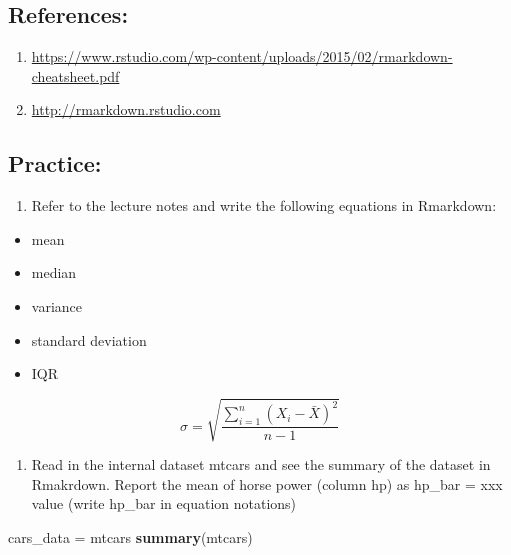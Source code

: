 \documentclass[]{article}
\newenvironment{Shaded}{\begin{snugshade}}{\end{snugshade}}
\newcommand{\KeywordTok}[1]{\textcolor[rgb]{0.13,0.29,0.53}{\textbf{#1}}}
\newcommand{\NormalTok}[1]{#1}
\newcommand{\StringTok}[1]{\textcolor[rgb]{0.31,0.60,0.02}{#1}}
\providecommand{\tightlist}{%
  \setlength{\itemsep}{0pt}\setlength{\parskip}{0pt}}
\begin{document}
\hypertarget{references}{%
\subsection{References:}\label{references}}

\begin{enumerate}
\def\labelenumi{\arabic{enumi}.}
\tightlist
\item
  \url{https://www.rstudio.com/wp-content/uploads/2015/02/rmarkdown-cheatsheet.pdf}
\item
  \url{http://rmarkdown.rstudio.com}
\end{enumerate}

\hypertarget{practice}{%
\subsection{Practice:}\label{practice}}

\begin{enumerate}
\def\labelenumi{\arabic{enumi}.}
\tightlist
\item
  Refer to the lecture notes and write the following equations in
  Rmarkdown:
\end{enumerate}

\begin{itemize}
\tightlist
\item
  mean
\item
  median
\item
  variance
\item
  standard deviation
\item
  IQR
\end{itemize}

\[{\sigma} = \sqrt{\frac{\sum_{i=1}^n (X_i - \bar{X})^2}{n-1}}\]

\begin{enumerate}
\def\labelenumi{\arabic{enumi}.}
\setcounter{enumi}{1}
\tightlist
\item
  Read in the internal dataset mtcars and see the summary of the dataset
  in Rmakrdown. Report the mean of horse power (column hp) as hp\_bar =
  xxx value (write hp\_bar in equation notations)
\end{enumerate}

\begin{Shaded}
\begin{Highlighting}[]
\NormalTok{cars_data =}\StringTok{ }\NormalTok{mtcars}
\KeywordTok{summary}\NormalTok{(mtcars)}
\end{Highlighting}
\end{Shaded}
\end{document}
